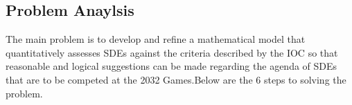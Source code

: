 \documentclass[12pt]{article}
\begin{document}

\subsection{Problem Anaylsis}

The main problem is to develop and refine a mathematical model that quantitatively assesses SDEs against the criteria described by the IOC so that reasonable and logical suggestions can be made regarding the agenda of SDEs that are to be competed at the 2032 Games.Below are the 6 steps to solving the problem.
\end{document}
